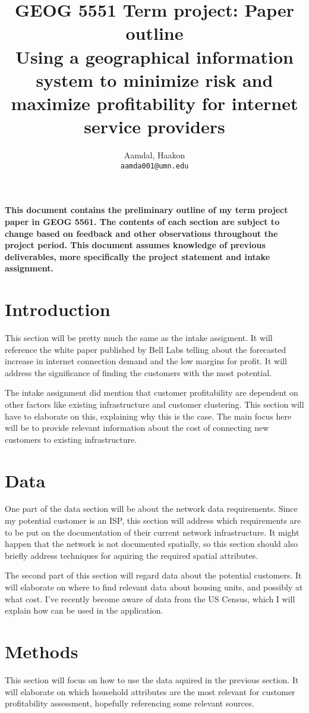 \documentclass[twocolumn]{article}
\title{
    GEOG 5551 Term project: Paper outline\\
    Using a geographical information system to minimize risk and maximize profitability for internet service providers
}
\author{
    Aamdal, Haakon\\
    \texttt{aamda001@umn.edu}
}
\begin{document}
\maketitle

\textbf{This document contains the preliminary outline of my term project paper in GEOG 5561. The contents of each section are subject to change based on feedback and other observations throughout the project period. This document assumes knowledge of previous deliverables, more specifically the project statement and intake assignment.}


\section{Introduction}
\label{sec:Introduction}
This section will be pretty much the same as the intake assigment. It will reference the white paper published by Bell Labs \cite{Bell_Labs2013-st} telling about the forecasted increase in internet connection demand and the low margins for profit. It will address the significance of finding the customers with the most potential.

The intake assignment did mention that customer profitability are dependent on other factors like existing infrastructure and customer clustering. This section will have to elaborate on this, explaining why this is the case. The main focus here will be to provide relevant information about the cost of connecting new customers to existing infrastructure.

\section{Data}
\label{sec:Data}
One part of the data section will be about the network data requirements. Since my potential customer is an ISP, this section will address which requirements are to be put on the documentation of their current network infrastructure. It might happen that the network is not documented spatially, so this section should also briefly address techniques for aquiring the required spatial attributes.

The second part of this section will regard data about the potential customers. It will elaborate on where to find relevant data about housing units, and possibly at what cost. I've recently become aware of data from the US Census, which I will explain how can be used in the application.

\section{Methods}
\label{sec:Methods}
This section will focus on how to use the data aquired in the previous section. It will elaborate on which household attributes are the most relevant for customer profitability assessment, hopefully referencing some relevant sources.
\end{document}
